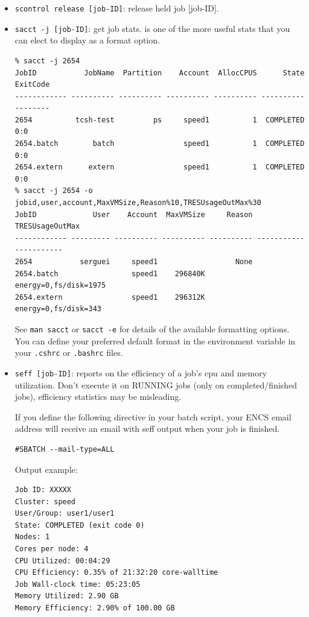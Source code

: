 \begin{itemize}
\item
\texttt{scontrol release [job-ID]}: release held job [job-ID]. 

\item
\texttt{sacct -j [job-ID]}: get job stats.
 is one of the more useful stats that you can elect to display
as a format option.

\small
\begin{verbatim}
% sacct -j 2654
JobID           JobName  Partition    Account  AllocCPUS      State ExitCode
------------ ---------- ---------- ---------- ---------- ---------- --------
2654          tcsh-test         ps     speed1          1  COMPLETED      0:0
2654.batch        batch                speed1          1  COMPLETED      0:0
2654.extern      extern                speed1          1  COMPLETED      0:0
% sacct -j 2654 -o jobid,user,account,MaxVMSize,Reason%10,TRESUsageOutMax%30
JobID             User    Account  MaxVMSize     Reason        TRESUsageOutMax
------------ --------- ---------- ---------- ---------- ----------------------
2654           serguei     speed1                  None
2654.batch                 speed1    296840K             energy=0,fs/disk=1975
2654.extern                speed1    296312K              energy=0,fs/disk=343
\end{verbatim}
\normalsize

See \texttt{man sacct} or \texttt{sacct -e} for details of the
available formatting options. You can define your preferred
default format in the  environment variable
in your \texttt{.cshrc} or \texttt{.bashrc} files.

\item
\texttt{seff [job-ID]}: reports on the efficiency of a job's cpu and memory utilization. 
Don't execute it on RUNNING jobs (only on completed/finished jobs), efficiency statistics may be misleading.

If you define the following directive in your batch script, your ENCS email address will receive an email with seff output when your job is finished.
\small
\begin{verbatim}
#SBATCH --mail-type=ALL        
\end{verbatim}
\normalsize

Output example:
\small
\begin{verbatim}
Job ID: XXXXX
Cluster: speed
User/Group: user1/user1
State: COMPLETED (exit code 0)
Nodes: 1
Cores per node: 4
CPU Utilized: 00:04:29
CPU Efficiency: 0.35% of 21:32:20 core-walltime
Job Wall-clock time: 05:23:05
Memory Utilized: 2.90 GB
Memory Efficiency: 2.90% of 100.00 GB
\end{verbatim}
\normalsize


\end{itemize}